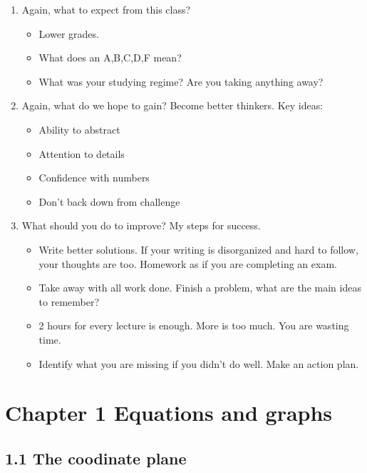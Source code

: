 \documentclass{article}
\begin{document}
\begin{enumerate}
\item Again, what to expect from this class?
\begin{itemize}
\item Lower grades.
\item What does an A,B,C,D,F mean?
\item What was your studying regime? Are you taking anything away?
\end{itemize}

\item Again, what do we hope to gain? Become better thinkers. Key ideas:
\begin{itemize}
\item Ability to abstract 
\item Attention to details
\item Confidence with numbers 
\item Don't back down from challenge
\end{itemize}

\item What should you do to improve? My steps for success.
\begin{itemize}
\item Write better solutions. If your writing is disorganized and hard to follow, your thoughts are too. Homework as if you are completing an exam.
\item Take away with all work done. Finish a problem, what are the main ideas to remember?
\item 2 hours for every lecture is enough. More is too much. You are wasting time.
\item Identify what you are missing if you didn't do well. Make an action plan.
\end{itemize}
\end{enumerate}


\section{Chapter 1 Equations and graphs}


\subsection{1.1 The coodinate plane}
\end{document}
